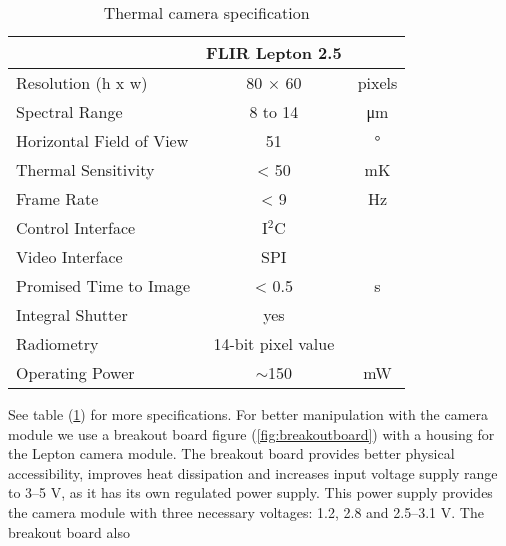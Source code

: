 \begin{table}[htb]
    \centering
    \caption{Thermal camera specification}
    \label{tab:thcamspecifications}
    \begin{tabular}{l c c}
        \hline
                                                            &   FLIR Lepton 2.5 	&          	\\
        \hline
        \rowcolor{aliceblue!85} Resolution (h x w)	       	&   80 $\times$ 60  	&	pixels	\\
        Spectral Range	                                    	&   8  to 14        	&	\si{\micro\meter}	\\
        \rowcolor{aliceblue!85} Horizontal Field of View		&   51              	&   \si{\degree}			\\
        Thermal Sensitivity	                                	&   < 50            	&   \si{\milli\kelvin}	\\
        \rowcolor{aliceblue!85} Frame Rate	                	&   < 9             	&   \si{\hertz} 			\\
        Control Interface	                                	&   I$^{2}$C        	&               			\\
        \rowcolor{aliceblue!85} Video Interface	            	&   SPI             	&               			\\
        Promised Time to Image	                            	&   < 0.5           	&   \si{\second}    		\\
        \rowcolor{aliceblue!85} Integral Shutter		    		&   yes             	&   			\\
        Radiometry	                                        	&   14-bit pixel value  	&       \\
        \rowcolor{aliceblue!85} Operating Power             	&	$\sim$150       	&   \si{\milli\watt} 	\\
        \hline
\end{tabular}
\end{table}
%
\linebreak See table (\ref{tab:thcamspecifications}) for more specifications. 
For better manipulation with the camera module we use a breakout board figure
(\ref{fig:breakoutboard}) with a housing for the Lepton camera module. 
The breakout board provides better physical accessibility, improves heat dissipation
and increases input voltage supply range to 3--5 \si{\volt}, as it has its own
regulated power supply. This power supply provides the camera module with three
necessary voltages: 1.2, 2.8 and 2.5--3.1 \si{\volt}. The breakout board also

